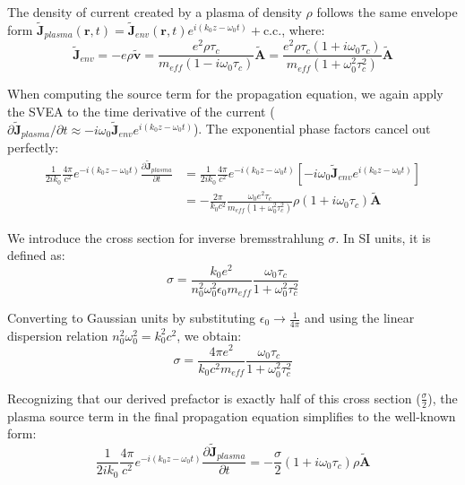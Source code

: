 \documentclass[11pt,a4paper]{article}
\begin{document}
The density of current created by a plasma of density $\rho$ follows the same envelope form $\tilde{\mathbf{J}}_{plasma}(\mathbf{r},t) = \tilde{\mathbf{J}}_{env}(\mathbf{r},t) e^{i(k_0z-\omega_0t)} + \text{c.c.}$, where:
\begin{equation*}
\tilde{\mathbf{J}}_{env} = -e\rho\tilde{\mathbf{v}} = \frac{e^2\rho\tau_c}{m_{eff}(1-i\omega_0\tau_c)}\tilde{\mathbf{A}} = \frac{e^2\rho\tau_c(1+i\omega_0\tau_c)}{m_{eff}(1+\omega_0^2\tau_c^2)}\tilde{\mathbf{A}}
\end{equation*}

When computing the source term for the propagation equation, we again apply the SVEA to the time derivative of the current ($\partial \tilde{\mathbf{J}}_{plasma} / \partial t \approx -i\omega_0 \tilde{\mathbf{J}}_{env} e^{i(k_0z-\omega_0t)}$). The exponential phase factors cancel out perfectly:
\begin{equation*}
\begin{split}
\frac{1}{2ik_0} \frac{4\pi}{c^2}e^{-i(k_0z-\omega_0t)}\frac{\partial \tilde{\mathbf{J}}_{plasma}}{\partial t} &= \frac{1}{2ik_0} \frac{4\pi}{c^2} e^{-i(k_0z-\omega_0t)} \left[ -i\omega_0 \tilde{\mathbf{J}}_{env} e^{i(k_0z-\omega_0t)} \right] \\
&= -\frac{2\pi}{k_0 c^2} \frac{\omega_0 e^2 \tau_c}{m_{eff}(1+\omega_0^2\tau_c^2)} \rho(1+i\omega_0\tau_c) \tilde{\mathbf{A}}
\end{split}
\end{equation*}

We introduce the cross section for inverse bremsstrahlung $\sigma$. In SI units, it is defined as:
\begin{equation*}
\sigma = \frac{k_0 e^2}{n_0^2\omega_0^2\epsilon_0 m_{eff}} \frac{\omega_0\tau_c}{1+\omega_0^2\tau_c^2}
\end{equation*}

Converting to Gaussian units by substituting $\epsilon_0 \to \frac{1}{4\pi}$ and using the linear dispersion relation $n_0^2\omega_0^2 = k_0^2 c^2$, we obtain:
\begin{equation*}
\sigma = \frac{4\pi e^2}{k_0 c^2 m_{eff}} \frac{\omega_0\tau_c}{1+\omega_0^2\tau_c^2}
\end{equation*}

Recognizing that our derived prefactor is exactly half of this cross section ($\frac{\sigma}{2}$), the plasma source term in the final propagation equation simplifies to the well-known form:
\begin{equation*}
\frac{1}{2ik_0} \frac{4\pi}{c^2}e^{-i(k_0z-\omega_0t)}\frac{\partial \tilde{\mathbf{J}}_{plasma}}{\partial t} = -\frac{\sigma}{2} (1+i\omega_0\tau_c) \rho \tilde{\mathbf{A}}
\end{equation*}
\end{document}
